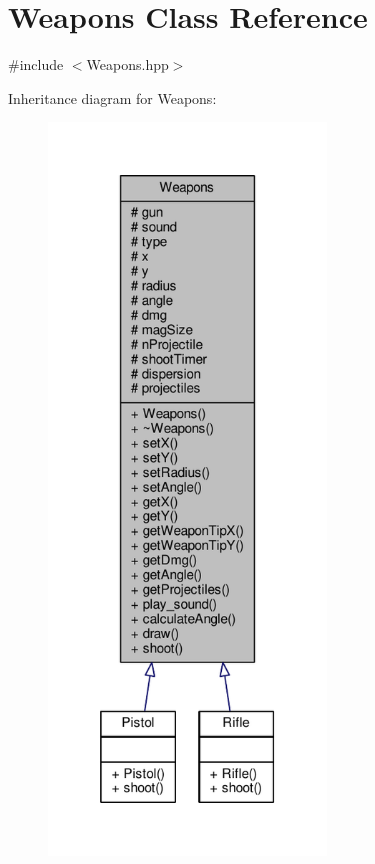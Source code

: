 \hypertarget{class_weapons}{}\section{Weapons Class Reference}
\label{class_weapons}


{\ttfamily \#include $<$Weapons.\+hpp$>$}



Inheritance diagram for Weapons\+:\nopagebreak
\begin{figure}[H]
\begin{center}
\leavevmode
\includegraphics[height=550pt]{class_weapons__inherit__graph}
\end{center}
\end{figure}


